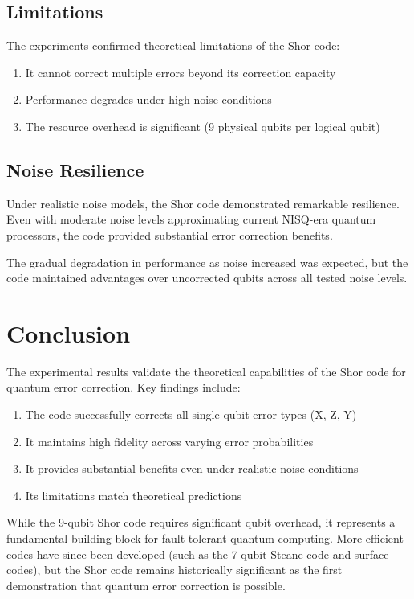 \documentclass[12pt,a4paper]{article}
\begin{document}
\subsection{Limitations}

The experiments confirmed theoretical limitations of the Shor code:
\begin{enumerate}
    \item It cannot correct multiple errors beyond its correction capacity
    \item Performance degrades under high noise conditions
    \item The resource overhead is significant (9 physical qubits per logical qubit)
\end{enumerate}

\subsection{Noise Resilience}

Under realistic noise models, the Shor code demonstrated remarkable resilience. Even with moderate noise levels approximating current NISQ-era quantum processors, the code provided substantial error correction benefits.

The gradual degradation in performance as noise increased was expected, but the code maintained advantages over uncorrected qubits across all tested noise levels.



\section{Conclusion}

The experimental results validate the theoretical capabilities of the Shor code for quantum error correction. Key findings include:

\begin{enumerate}
    \item The code successfully corrects all single-qubit error types (X, Z, Y)
    \item It maintains high fidelity across varying error probabilities
    \item It provides substantial benefits even under realistic noise conditions
    \item Its limitations match theoretical predictions
\end{enumerate}

While the 9-qubit Shor code requires significant qubit overhead, it represents a fundamental building block for fault-tolerant quantum computing. More efficient codes have since been developed (such as the 7-qubit Steane code and surface codes), but the Shor code remains historically significant as the first demonstration that quantum error correction is possible.
\end{document}

